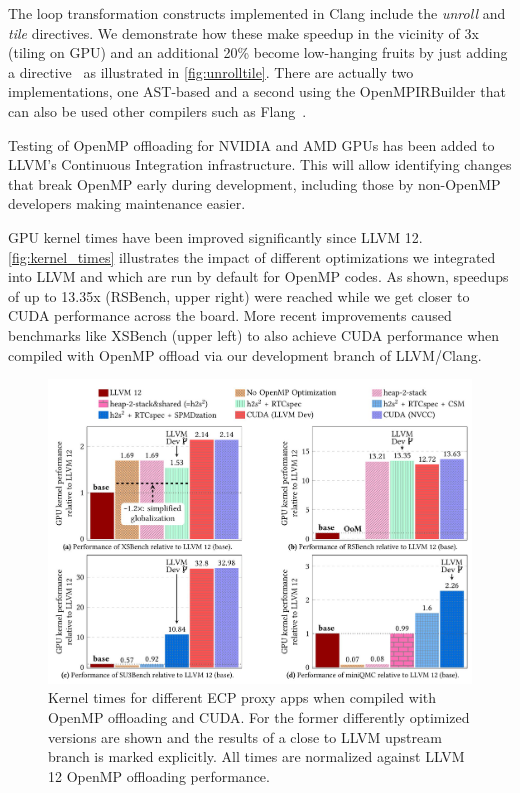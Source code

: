 The loop transformation constructs implemented in Clang include the \emph{unroll} and \emph{tile} directives.
We demonstrate how these make speedup in the vicinity of 3x (tiling on GPU) and an additional 20\% become
low-hanging fruits by just adding a directive~\cite{kruse2021openmpbooth} as illustrated in \autoref{fig:unrolltile}.
There are actually two implementations, one AST-based and a second using the OpenMPIRBuilder that can also be used other compilers such as Flang~\cite{kruse2021clangast}.

Testing of OpenMP offloading for NVIDIA and AMD GPUs has been added to LLVM's Continuous Integration infrastructure.
This will allow identifying changes that break OpenMP early during development, including those by non-OpenMP developers making maintenance easier.

GPU kernel times have been improved significantly since LLVM 12. \autoref{fig:kernel_times} illustrates the impact of
different optimizations we integrated into LLVM and which are run by default for OpenMP codes. As shown, speedups
of up to 13.35x (RSBench, upper right) were reached while we get closer to CUDA
performance across the board. More recent improvements caused benchmarks like
XSBench (upper left) to also achieve CUDA performance when compiled with OpenMP
offload via our development branch of LLVM/Clang.

\begin{figure}[hbt!]
\centering
\includegraphics[width=0.95\linewidth]{projects/2.3.2-Tools/2.3.2.11-SOLLVE/LLVM-opt-kernel-times.jpg}
\caption[]{Kernel times for different ECP proxy apps when compiled with OpenMP offloading and CUDA. For the former differently optimized versions are shown and the results of a close to LLVM upstream branch is marked explicitly. All times are normalized against LLVM 12 OpenMP offloading performance.}
\label{fig:kernel_times}
\end{figure}

